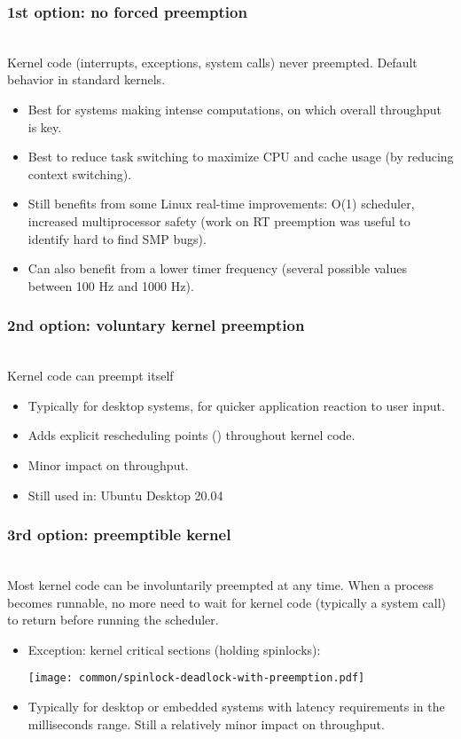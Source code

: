 \begin{frame}
  \frametitle{1st option: no forced preemption}
  \\
  Kernel code (interrupts, exceptions, system calls) never preempted.
  Default behavior in standard kernels.
  \begin{itemize}
  \item Best for systems making intense computations, on which overall
    throughput is key.
  \item Best to reduce task switching to maximize CPU and cache usage
    (by reducing context switching).
  \item Still benefits from some Linux real-time improvements: O(1)
    scheduler, increased multiprocessor safety (work on RT preemption
    was useful to identify hard to find SMP bugs).
  \item Can also benefit from a lower timer frequency (several possible
        values between 100 Hz and 1000 Hz).
  \end{itemize}
\end{frame}

\begin{frame}
  \frametitle{2nd option: voluntary kernel preemption}
  \\
  Kernel code can preempt itself
  \begin{itemize}
  \item Typically for desktop systems, for quicker application
    reaction to user input.
  \item Adds explicit rescheduling points ()
        throughout kernel code.
  \item Minor impact on throughput.
  \item Still used in: Ubuntu Desktop 20.04
  \end{itemize}
\end{frame}

\begin{frame}
  \frametitle{3rd option: preemptible kernel}
  \\
  Most kernel code can be involuntarily preempted at any time.  When a
  process becomes runnable, no more need to wait for kernel code
  (typically a system call) to return before running the scheduler.
  \begin{itemize}
  \item Exception: kernel critical sections (holding spinlocks):
  \begin{center}
    \texttt{[image: common/spinlock-deadlock-with-preemption.pdf]}
  \end{center}
  \item Typically for desktop or embedded systems with latency
    requirements in the milliseconds range. Still a relatively minor impact on throughput.
  \end{itemize}
\end{frame}

